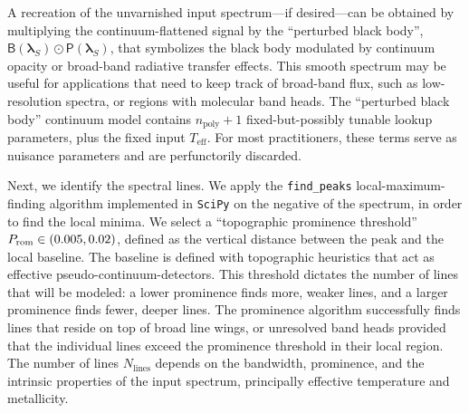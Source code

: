 \documentclass[twocolumn]{aastex631}
\begin{document}
A recreation of the unvarnished input spectrum---if desired---can be obtained by multiplying the continuum-flattened signal by the ``perturbed black body'', $\mathsf{B}(\bm{\lambda}_S)\odot \mathsf{P}(\bm{\lambda}_S)$, that symbolizes the black body modulated by continuum opacity or broad-band radiative transfer effects.  This smooth spectrum may be useful for applications that need to keep track of broad-band flux, such as low-resolution spectra, or regions with molecular band heads. The ``perturbed black body'' continuum model contains $n_{\mathrm{poly}}+1$ fixed-but-possibly tunable lookup parameters, plus the fixed input $T_{\mathrm{eff}}$.  For most practitioners, these terms serve as nuisance parameters and are perfunctorily discarded.

Next, we identify the spectral lines. We apply the \texttt{find\_peaks} local-maximum-finding algorithm implemented in \texttt{SciPy} \citep{2020SciPy-NMeth} on the negative of the spectrum, in order to find the local minima.  We select a ``topographic prominence threshold'' $P_{\rm rom} \in (0.005, 0.02)$, defined as the vertical distance between the peak and the local baseline.  The baseline is defined with topographic heuristics that act as effective pseudo-continuum-detectors.  This threshold dictates the number of lines that will be modeled: a lower prominence finds more, weaker lines, and a larger prominence finds fewer, deeper lines. The prominence algorithm successfully finds lines that reside on top of broad line wings, or unresolved band heads provided that the individual lines exceed the prominence threshold in their local region. The number of lines $N_{\mathrm{lines}}$ depends on the bandwidth, prominence, and the intrinsic properties of the input spectrum, principally effective temperature and metallicity.
\end{document}
